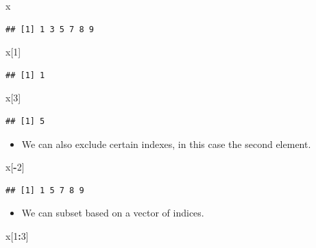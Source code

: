 \documentclass[]{book}
\newenvironment{Shaded}{\begin{snugshade}}{\end{snugshade}}
\newcommand{\DecValTok}[1]{\textcolor[rgb]{0.00,0.00,0.81}{#1}}
\newcommand{\OperatorTok}[1]{\textcolor[rgb]{0.81,0.36,0.00}{\textbf{#1}}}
\newcommand{\NormalTok}[1]{#1}
\providecommand{\tightlist}{%
  \setlength{\itemsep}{0pt}\setlength{\parskip}{0pt}}
\begin{document}
\begin{Shaded}
\begin{Highlighting}[]
\NormalTok{x}
\end{Highlighting}
\end{Shaded}

\begin{verbatim}
## [1] 1 3 5 7 8 9
\end{verbatim}

\begin{Shaded}
\begin{Highlighting}[]
\NormalTok{x[}\DecValTok{1}\NormalTok{]}
\end{Highlighting}
\end{Shaded}

\begin{verbatim}
## [1] 1
\end{verbatim}

\begin{Shaded}
\begin{Highlighting}[]
\NormalTok{x[}\DecValTok{3}\NormalTok{]}
\end{Highlighting}
\end{Shaded}

\begin{verbatim}
## [1] 5
\end{verbatim}

\begin{itemize}
\tightlist
\item
  We can also exclude certain indexes, in this case the second element.
\end{itemize}

\begin{Shaded}
\begin{Highlighting}[]
\NormalTok{x[}\OperatorTok{-}\DecValTok{2}\NormalTok{]}
\end{Highlighting}
\end{Shaded}

\begin{verbatim}
## [1] 1 5 7 8 9
\end{verbatim}

\begin{itemize}
\tightlist
\item
  We can subset based on a vector of indices.
\end{itemize}

\begin{Shaded}
\begin{Highlighting}[]
\NormalTok{x[}\DecValTok{1}\OperatorTok{:}\DecValTok{3}\NormalTok{]}
\end{Highlighting}
\end{Shaded}
\end{document}

